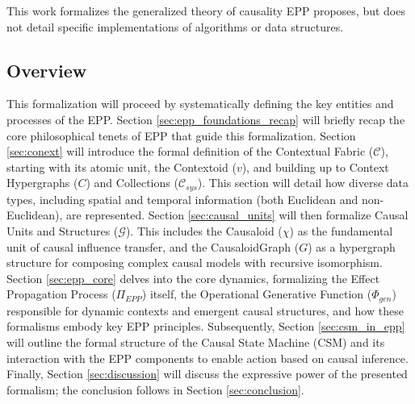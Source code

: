 This work formalizes the generalized theory of causality EPP proposes, but does not detail specific implementations of 
algorithms or data structures.

\subsection{Overview}
\label{sec:formal_intro_overview}

   This formalization will proceed by systematically defining the key entities and processes of the EPP.
    Section \ref{sec:epp_foundations_recap} will briefly recap the core philosophical tenets of EPP that guide this formalization.
    Section \ref{sec:conext} will introduce the formal definition of the Contextual Fabric (\(\mathcal{C}\)), starting with its atomic unit, the Contextoid (\(v\)), and building up to Context Hypergraphs (\(C\)) and Collections (\(\mathcal{C}_{sys}\)). This section will detail how diverse data types, including spatial and temporal information (both Euclidean and non-Euclidean), are represented.
    Section \ref{sec:causal_units} will then formalize Causal Units and Structures (\(\mathcal{G}\)). This includes the Causaloid (\(\chi\)) as the fundamental unit of causal influence transfer, and the CausaloidGraph (\(G\)) as a hypergraph structure for composing complex causal models with recursive isomorphism.
    Section \ref{sec:epp_core} delves into the core dynamics, formalizing the Effect Propagation Process (\(\Pi_{EPP}\)) itself, the Operational Generative Function (\(\Phi_{gen}\)) responsible for dynamic contexts and emergent causal structures, and how these formalisms embody key EPP principles.
    Subsequently, Section \ref{sec:csm_in_epp} will outline the formal structure of the Causal State Machine (CSM) and its interaction with the EPP components to enable action based on causal inference.
    Finally, Section \ref{sec:discussion} will discuss the expressive power of the presented formalism; the conclusion follows in Section \ref{sec:conclusion}.
